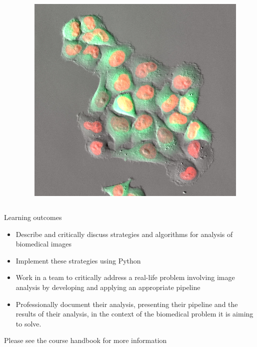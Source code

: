 \documentclass[9pt, aspectratio=169]{beamer}
\begin{document}
\begin{frame}
\begin{columns}
\begin{column}{0.6\textwidth}
        \end{column}
        \begin{column}{0.3\textwidth}
            \begin{figure}
                \includegraphics[width=\textwidth]{cells.jpg}
                \caption{\color{gray}{Zeiss - CC-BY-2.0}}
            \end{figure}
        \end{column}
    \end{columns}
\end{frame}

\begin{frame}
    {Learning outcomes}
    \begin{itemize}
        \item Describe and critically discuss strategies and algorithms for analysis of biomedical images
        \item Implement these strategies using Python
        \item Work in a team to critically address a real-life problem involving image analysis by developing and applying an appropriate pipeline
        \item Professionally document their analysis, presenting their pipeline and the results of their analysis, in the context of the biomedical problem it is aiming to solve.
    \end{itemize}
    \vspace{2em}
    Please see the course handbook for more information
\end{frame}
\end{document}
